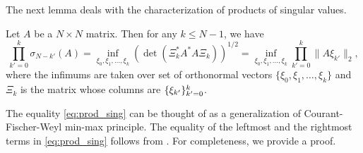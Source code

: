 \documentclass{amsart}
\numberwithin{equation}{section}
\def\corA{}
\def\corAB{}
\def\corOZ{}
\def\corABrev{\textcolor{black}}
\begin{document}
\corAB{The next lemma} \corOZ{deals with the} characterization of products of singular values.
\corA{
\begin{lemma}\label{lem:prod_sing}
Let $A$ be a $N \times N$ matrix. Then for any $k \le N-1$, we have
\begin{equation}
  \prod_{k'=0}^k \sigma_{N-k'}(A)
  =\inf_{\xi_0,\xi_1,\ldots,\xi_k} \left(\det(\Xi_k^* A^* A \Xi_k)\right)^{1/2}= \inf_{\xi_0,\xi_1,\dots,\xi_k}
  \prod_{k'=0}^k
  \| A \xi_{k'}\|_2,
  \label{eq:prod_sing}
\end{equation}
where the infimums are taken over set of orthonormal vectors $\{\xi_0,\xi_1,\ldots,\xi_k\}$ and $\Xi_k$ is the matrix whose columns are $\{\xi_{k'}\}_{k'=\corABrev{0}}^k$.
\end{lemma}
}
\corAB{The equality \eqref{eq:prod_sing} can be thought of as a generalization of Courant-Fischer-Weyl min-max principle. The equality of the leftmost and the rightmost terms in \eqref{eq:prod_sing} follows from}
\cite[Page 200, Ex. 12]{horn2012matrix}. For completeness, we provide a proof.
\end{document}
